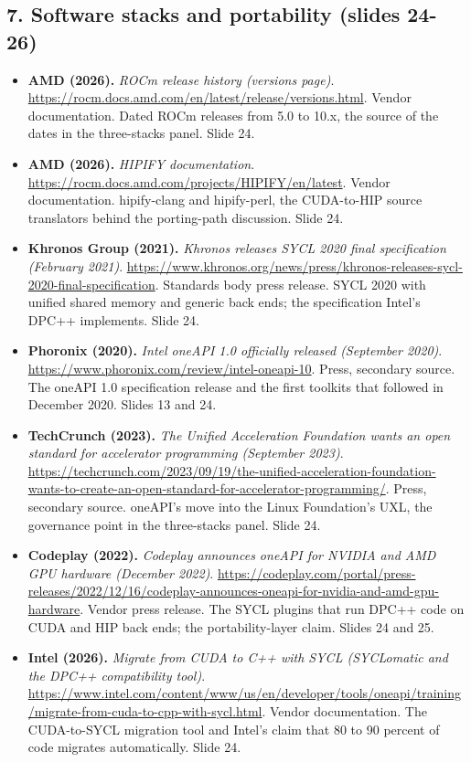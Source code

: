 \documentclass[11pt,letterpaper]{article}
\begin{document}
\subsection*{7. Software stacks and portability (slides 24-26)}
\begin{itemize}[leftmargin=1.2em,itemsep=3pt]\sloppy
\item \textbf{AMD (2026).} \textit{ROCm release history (versions page)}. \url{https://rocm.docs.amd.com/en/latest/release/versions.html}. Vendor documentation. Dated ROCm releases from 5.0 to 10.x, the source of the dates in the three-stacks panel. Slide 24.
\item \textbf{AMD (2026).} \textit{HIPIFY documentation}. \url{https://rocm.docs.amd.com/projects/HIPIFY/en/latest}. Vendor documentation. hipify-clang and hipify-perl, the CUDA-to-HIP source translators behind the porting-path discussion. Slide 24.
\item \textbf{Khronos Group (2021).} \textit{Khronos releases SYCL 2020 final specification (February 2021)}. \url{https://www.khronos.org/news/press/khronos-releases-sycl-2020-final-specification}. Standards body press release. SYCL 2020 with unified shared memory and generic back ends; the specification Intel's DPC++ implements. Slide 24.
\item \textbf{Phoronix (2020).} \textit{Intel oneAPI 1.0 officially released (September 2020)}. \url{https://www.phoronix.com/review/intel-oneapi-10}. Press, secondary source. The oneAPI 1.0 specification release and the first toolkits that followed in December 2020. Slides 13 and 24.
\item \textbf{TechCrunch (2023).} \textit{The Unified Acceleration Foundation wants an open standard for accelerator programming (September 2023)}. \url{https://techcrunch.com/2023/09/19/the-unified-acceleration-foundation-wants-to-create-an-open-standard-for-accelerator-programming/}. Press, secondary source. oneAPI's move into the Linux Foundation's UXL, the governance point in the three-stacks panel. Slide 24.
\item \textbf{Codeplay (2022).} \textit{Codeplay announces oneAPI for NVIDIA and AMD GPU hardware (December 2022)}. \url{https://codeplay.com/portal/press-releases/2022/12/16/codeplay-announces-oneapi-for-nvidia-and-amd-gpu-hardware}. Vendor press release. The SYCL plugins that run DPC++ code on CUDA and HIP back ends; the portability-layer claim. Slides 24 and 25.
\item \textbf{Intel (2026).} \textit{Migrate from CUDA to C++ with SYCL (SYCLomatic and the DPC++ compatibility tool)}. \url{https://www.intel.com/content/www/us/en/developer/tools/oneapi/training/migrate-from-cuda-to-cpp-with-sycl.html}. Vendor documentation. The CUDA-to-SYCL migration tool and Intel's claim that 80 to 90 percent of code migrates automatically. Slide 24.

\end{itemize}
\end{document}
